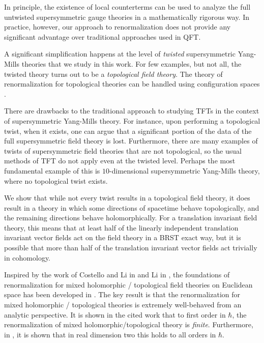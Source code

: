 \documentclass[10pt, oneside]{article}
\begin{document}
In principle, the existence of local counterterms can be used to analyze the full untwisted supersymmetric gauge theories in a mathematically rigorous way.
In practice, however, our approach to renormalization does not provide any significant advantage over traditional approaches used in QFT. 

A significant simplification happens at the level of {\em twisted} supersymmetric Yang-Mills theories that we study in this work. 
For few examples, but not all, the twisted theory turns out to be a {\em topological field theory}. 
The theory of renormalization for topological theories can be handled using configuration spaces \cite{Kontsevich}.  

There are drawbacks to the traditional approach to studying TFTs in the context of supersymmetric Yang-Mills theory.
For instance, upon performing a topological twist, when it exists, one can argue that a significant portion of the data of the full supersymmetric field theory is lost.
Furthermore, there are many examples of twists of supersymmetric field theories that are not topological, so the usual methods of TFT do not apply even at the twisted level. 
Perhaps the most fundamental example of this is $10$-dimensional supersymmetric Yang-Mills theory, where no topological twist exists. 

We show that while not every twist results in a topological field theory, it does result in a theory in which some directions of spacetime behave topologically, and the remaining directions behave holomorphically. 
For a translation invariant field theory, this means that at least half of the linearly independent translation invariant vector fields act on the field theory in a BRST exact way, but it is possible that more than half of the translation invariant vector fields act trivially in cohomology.

Inspired by the work of Costello and Li in \cite{BCOV1} and Li in \cite{LiVertex, LiFeynman}, the foundations of renormalization for mixed holomorphic / topological field theories on Euclidean space has been developed in \cite{BWhol}.
The key result is that the renormalization for mixed holomorphic / topological theories is extremely well-behaved from an analytic perspective. 
It is shown in the cited work that to first order in $\hbar$, the renormalization of mixed holomorphic/topological theory is {\em finite}. 
Furthermore, in \cite{LiVertex}, it is shown that in real dimension two this holds to all orders in $\hbar$. 
\end{document}
